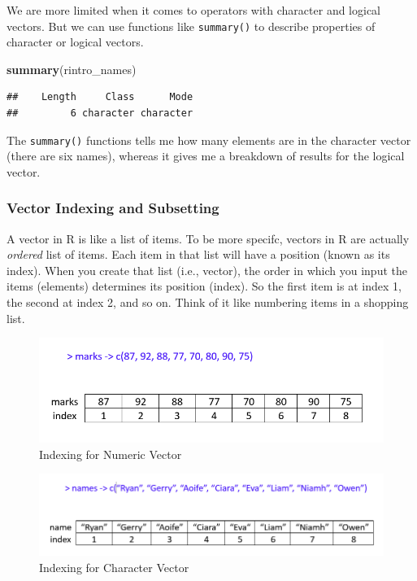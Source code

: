 \documentclass[
]{book}
\newenvironment{Shaded}{\begin{snugshade}}{\end{snugshade}}
\newcommand{\FunctionTok}[1]{\textcolor[rgb]{0.13,0.29,0.53}{\textbf{#1}}}
\newcommand{\NormalTok}[1]{#1}
\begin{document}
We are more limited when it comes to operators with character and logical vectors. But we can use functions like \texttt{summary()} to describe properties of character or logical vectors.

\begin{Shaded}
\begin{Highlighting}[]
\FunctionTok{summary}\NormalTok{(rintro\_names)}
\end{Highlighting}
\end{Shaded}

\begin{verbatim}
##    Length     Class      Mode 
##         6 character character
\end{verbatim}

The \texttt{summary()} functions tells me how many elements are in the character vector (there are six names), whereas it gives me a breakdown of results for the logical vector.

\hypertarget{vector-indexing-and-subsetting}{%
\subsubsection{Vector Indexing and Subsetting}\label{vector-indexing-and-subsetting}}

A vector in R is like a list of items. To be more specifc, vectors in R are actually \emph{ordered} list of items. Each item in that list will have a position (known as its index). When you create that list (i.e., vector), the order in which you input the items (elements) determines its position (index). So the first item is at index 1, the second at index 2, and so on. Think of it like numbering items in a shopping list.

\begin{figure}
\centering
\includegraphics{img/03-index_numeric.png}
\caption{\label{fig:unnamed-chunk-49}Indexing for Numeric Vector}
\end{figure}

\begin{figure}
\centering
\includegraphics{img/03-index-character.png}
\caption{\label{fig:unnamed-chunk-50}Indexing for Character Vector}
\end{figure}
\end{document}
